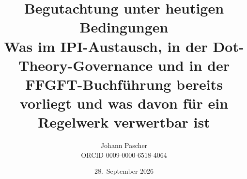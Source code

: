 \documentclass[11pt,a4paper]{report}
\title{Begutachtung unter heutigen Bedingungen\\[0.5em]\large Was im IPI-Austausch, in der Dot-Theory-Governance und in der FFGFT-Buchführung bereits vorliegt und was davon für ein Regelwerk verwertbar ist}
\date{28.~September 2026}
\author{Johann Pascher\\\small ORCID 0009-0000-6518-4064}
\begin{document}
\renewcommand{\thechapter}{}
\renewcommand{\thesection}{\arabic{section}}
\maketitle
\tableofcontents

\end{document}
